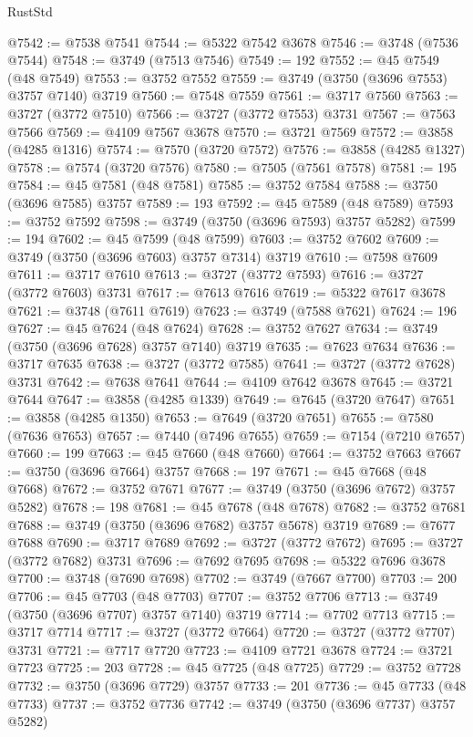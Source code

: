 \begin{lexlean}{RustStd}
\begin{coremodule}
@7542 := @7538 @7541
@7544 := @5322 @7542 @3678
@7546 := @3748 (@7536 @7544)
@7548 := @3749 (@7513 @7546)
@7549 := 192
@7552 := @45 @7549 (@48 @7549)
@7553 := @3752 @7552
@7559 := @3749 (@3750 (@3696 @7553) @3757 @7140) @3719
@7560 := @7548 @7559
@7561 := @3717 @7560
@7563 := @3727 (@3772 @7510)
@7566 := @3727 (@3772 @7553) @3731
@7567 := @7563 @7566
@7569 := @4109 @7567 @3678
@7570 := @3721 @7569
@7572 := @3858 (@4285 @1316)
@7574 := @7570 (@3720 @7572)
@7576 := @3858 (@4285 @1327)
@7578 := @7574 (@3720 @7576)
@7580 := @7505 (@7561 @7578)
@7581 := 195
@7584 := @45 @7581 (@48 @7581)
@7585 := @3752 @7584
@7588 := @3750 (@3696 @7585) @3757
@7589 := 193
@7592 := @45 @7589 (@48 @7589)
@7593 := @3752 @7592
@7598 := @3749 (@3750 (@3696 @7593) @3757 @5282)
@7599 := 194
@7602 := @45 @7599 (@48 @7599)
@7603 := @3752 @7602
@7609 := @3749 (@3750 (@3696 @7603) @3757 @7314) @3719
@7610 := @7598 @7609
@7611 := @3717 @7610
@7613 := @3727 (@3772 @7593)
@7616 := @3727 (@3772 @7603) @3731
@7617 := @7613 @7616
@7619 := @5322 @7617 @3678
@7621 := @3748 (@7611 @7619)
@7623 := @3749 (@7588 @7621)
@7624 := 196
@7627 := @45 @7624 (@48 @7624)
@7628 := @3752 @7627
@7634 := @3749 (@3750 (@3696 @7628) @3757 @7140) @3719
@7635 := @7623 @7634
@7636 := @3717 @7635
@7638 := @3727 (@3772 @7585)
@7641 := @3727 (@3772 @7628) @3731
@7642 := @7638 @7641
@7644 := @4109 @7642 @3678
@7645 := @3721 @7644
@7647 := @3858 (@4285 @1339)
@7649 := @7645 (@3720 @7647)
@7651 := @3858 (@4285 @1350)
@7653 := @7649 (@3720 @7651)
@7655 := @7580 (@7636 @7653)
@7657 := @7440 (@7496 @7655)
@7659 := @7154 (@7210 @7657)
@7660 := 199
@7663 := @45 @7660 (@48 @7660)
@7664 := @3752 @7663
@7667 := @3750 (@3696 @7664) @3757
@7668 := 197
@7671 := @45 @7668 (@48 @7668)
@7672 := @3752 @7671
@7677 := @3749 (@3750 (@3696 @7672) @3757 @5282)
@7678 := 198
@7681 := @45 @7678 (@48 @7678)
@7682 := @3752 @7681
@7688 := @3749 (@3750 (@3696 @7682) @3757 @5678) @3719
@7689 := @7677 @7688
@7690 := @3717 @7689
@7692 := @3727 (@3772 @7672)
@7695 := @3727 (@3772 @7682) @3731
@7696 := @7692 @7695
@7698 := @5322 @7696 @3678
@7700 := @3748 (@7690 @7698)
@7702 := @3749 (@7667 @7700)
@7703 := 200
@7706 := @45 @7703 (@48 @7703)
@7707 := @3752 @7706
@7713 := @3749 (@3750 (@3696 @7707) @3757 @7140) @3719
@7714 := @7702 @7713
@7715 := @3717 @7714
@7717 := @3727 (@3772 @7664)
@7720 := @3727 (@3772 @7707) @3731
@7721 := @7717 @7720
@7723 := @4109 @7721 @3678
@7724 := @3721 @7723
@7725 := 203
@7728 := @45 @7725 (@48 @7725)
@7729 := @3752 @7728
@7732 := @3750 (@3696 @7729) @3757
@7733 := 201
@7736 := @45 @7733 (@48 @7733)
@7737 := @3752 @7736
@7742 := @3749 (@3750 (@3696 @7737) @3757 @5282)

\end{coremodule}
\end{lexlean}
